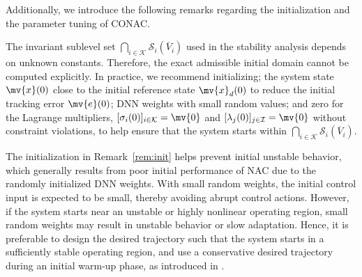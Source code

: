 \documentclass[letterpaper, journal]{IEEEtran}
\begin{document}

Additionally, we introduce the following remarks regarding the initialization and the parameter tuning of CONAC.

\begin{remark} \label{rem:init}
  The invariant sublevel set 
  $
    \bigcap_{i\in\mathcal{K}} 
    \mathcal{S}_i(\overline{V}_i)
  $ 
  used in the stability analysis depends on unknown constants.
  Therefore, the exact admissible initial domain cannot be computed explicitly.
  In practice, we recommend initializing; the system state $\mv{x}(0)$ close to the initial reference state $\mv{x}_d(0)$ to reduce the initial tracking error $\mv{e}(0)$; DNN weights with small random values; and zero for the Lagrange multipliers, $[\sigma_i(0)]_{i\in\mathcal{K}}=\mv{0}$ and $[\lambda_j(0)]_{j\in\mathcal{I}}=\mv{0}$ without constraint violations, to help ensure that the system starts within
  $
    \bigcap_{i\in\mathcal{K}} 
    \mathcal{S}_i(\overline{V}_i)
    .
  $
\end{remark}

\begin{remark} \label{rem:ref}  
  The initialization in Remark~\ref{rem:init} helps prevent initial unstable behavior, which generally results from poor initial performance of NAC due to the randomly initialized DNN weights.
  With small random weights, the initial control input is expected to be small, thereby avoiding abrupt control actions.
  However, if the system starts near an unstable or highly nonlinear operating region, small random weights may result in unstable behavior or slow adaptation.
  Hence, it is preferable to design the desired trajectory such that the system starts in a sufficiently stable operating region, and use a conservative desired trajectory during an initial warm-up phase, as introduced in \cite{Ryu:2025aa}.
\end{remark}
\end{document}
